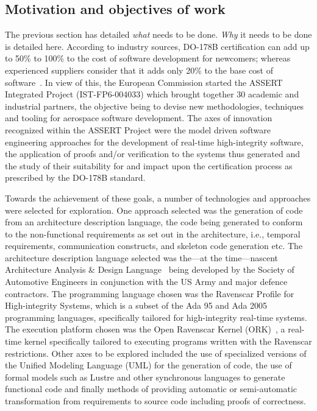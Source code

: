 \subsection{Motivation and objectives of work}
The previous section has detailed \emph{what} needs to be
done. \emph{Why} it needs to be done is detailed here. According to
industry sources, DO-178B certification can add up to 50\% to 100\% to
the cost of software development for newcomers; whereas experienced
suppliers consider that it adds only 20\% to the base cost of
software~\cite{do178b-cost}. In view of this, the European Commission
started the ASSERT Integrated Project (IST-FP6-004033) which brought
together 30 academic and industrial partners, the objective being to
devise new methodologies, techniques and tooling for aerospace
software development. The axes of innovation recognized within the
ASSERT Project were the model driven software engineering approaches
for the development of real-time high-integrity software, the
application of proofs and/or verification to the systems thus
generated and the study of their suitability for and impact upon the
certification process as prescribed by the DO-178B standard.

Towards the achievement of these goals, a number of technologies and
approaches were selected for exploration. One approach selected was
the generation of code from an architecture description language, the
code being generated to conform to the non-functional requirements as
set out in the architecture, i.e., temporal requirements,
communication constructs, and skeleton code generation etc. The
architecture description language selected was the---at the
time---nascent Architecture Analysis \& Design Language~\cite{AS5506}
being developed by the Society of Automotive Engineers in conjunction
with the US Army and major defence contractors. The programming
language chosen was the Ravenscar Profile for High-integrity Systems,
which is a subset of the Ada 95 and Ada 2005 programming languages,
specifically tailored for high-integrity real-time systems. The
execution platform chosen was the Open Ravenscar Kernel
(ORK)~\cite{puente@ae00}, a real-time kernel specifically tailored to
executing programs written with the Ravenscar restrictions. Other axes
to be explored included the use of specialized versions of the Unified
Modeling Language (UML) for the generation of code, the use of formal
models such as Lustre and other synchronous languages to generate
functional code and finally methods of providing automatic or
semi-automatic transformation from requirements to source code
including proofs of correctness.

